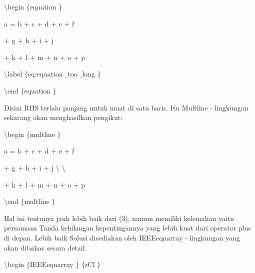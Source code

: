 \begin{itemize}
\vspace{12pt}
\vspace{12pt}
\noindent 
 $  \setminus  $begin $  \{  $equation $  \}  $ \par
\vspace{12pt}
\noindent 
a = b + c + d + e + f \par
\vspace{12pt}
\noindent 
+ g + h + i + j \par
\vspace{12pt}
\noindent 
+ k + l + m + n + o + p \par
\vspace{12pt}
\noindent 
 $  \setminus  $label $  \{  $eq:equation $  \_  $too $  \_  $long $  \}  $ \par
\vspace{12pt}
\noindent 
 $  \setminus  $end $  \{  $equation $  \}  $ \par
\vspace{12pt}
\vspace{16pt}
\noindent 
Disini RHS terlalu panjang untuk muat di satu baris. Itu Multline - lingkungan sekarang akan menghasilkan pengikut: \par
\vspace{12pt}
\noindent 
 $  \setminus  $begin $  \{  $multline $  \}  $ \par
\vspace{12pt}
\noindent 
a = b + c + d + e + f \par
\vspace{12pt}
\noindent 
+ g + h + i + j  $  \setminus  $ $  \setminus  $ \par
\vspace{12pt}
\noindent 
+ k + l + m + n + o + p \par
\vspace{12pt}
\noindent 
 $  \setminus  $end $  \{  $multline $  \}  $ \par
\vspace{12pt}
\vspace{16pt}
\noindent 
 \hspace*{0.5in} Hal ini tentunya jauh lebih baik dari (3), namun memiliki kelemahan yaitu persamaan Tanda kehilangan kepentingannya yang lebih kuat dari operator plus di depan. Lebih baik Solusi disediakan oleh IEEEeqnarray - lingkungan yang akan dibahas secara detail. \par
\vspace{12pt}
\noindent 
 $  \setminus  $begin $  \{  $IEEEeqnarray $  \}  $ $  \{  $rCl $  \}  $ \par

\end{itemize}
